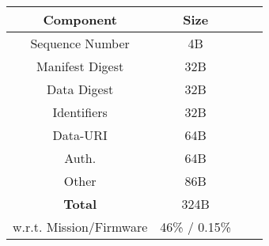 \documentclass{standalone}
\begin{document}
\begin{tabular}{cccc}
    \hline
    \textbf{Component}          & Size \\ \hline
            Sequence Number     & 4B      \\
            Manifest Digest           & 32B        \\
            Data Digest               & 32B          \\
            Identifiers       & 32B          \\
            Data-URI           & 64B       \\
            Auth.     & 64B        \\
            Other     & 86B       \\ \hline
    \textbf{Total}          & 324B        \\ \hline
    w.r.t. Mission/Firmware  & 46\% / 0.15\%    

\end{tabular}%
\end{document}

